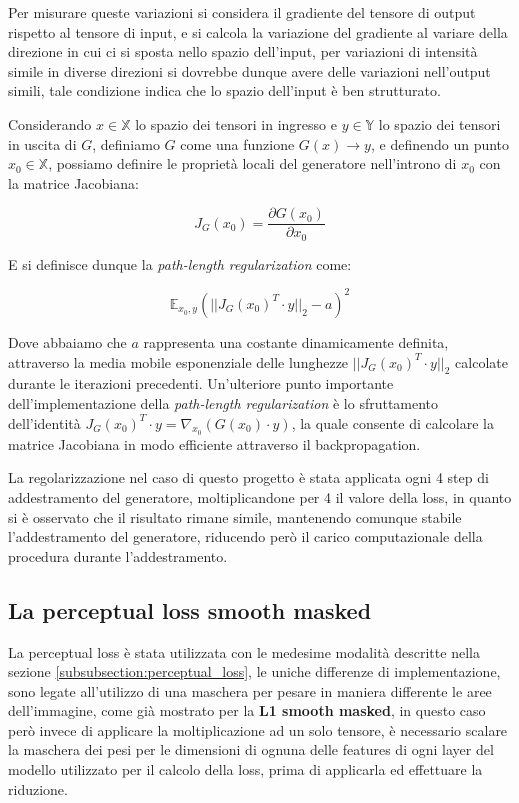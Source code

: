 Per misurare queste variazioni si considera il gradiente del tensore di output rispetto al tensore di input, e si calcola la variazione del gradiente
al variare della direzione in cui ci si sposta nello spazio dell'input, per variazioni di intensità simile in diverse direzioni si dovrebbe dunque avere delle variazioni
nell'output simili, tale condizione indica che lo spazio dell'input è ben strutturato.

Considerando $x \in \mathbb{X}$ lo spazio dei tensori in ingresso e $y \in \mathbb{Y}$ lo spazio dei tensori in uscita di $G$, definiamo $G$ come una funzione
$G(x) \rightarrow y$, e definendo un punto $x_0 \in \mathbb{X}$, possiamo definire le proprietà locali del generatore nell'introno di $x_0$ con la matrice Jacobiana:

\begin{equation}
    J_{G}(x_0) = \frac{\partial G(x_0)}{\partial x_0}
    \label{eq:jacobian_matrix}
\end{equation}

E si definisce dunque la \textit{path-length regularization} come:

\begin{equation}
    \mathbb{E}_{x_0,y}(||J_{G}(x_0)^T \cdot y||_2 - a)^2
    \label{eq:path_length_regularization}
\end{equation}

Dove abbaiamo che $a$ rappresenta una costante dinamicamente definita, attraverso la media mobile esponenziale delle lunghezze 
$||J_{G}(x_0)^T \cdot y||_2$ calcolate durante le iterazioni precedenti.
Un'ulteriore punto importante dell'implementazione della \textit{path-length regularization} è lo sfruttamento dell'identità 
$J_{G}(x_0)^T \cdot y = \nabla_{x_0}(G(x_0) \cdot y)$, la quale consente di calcolare la matrice Jacobiana in modo efficiente attraverso il backpropagation.

La regolarizzazione nel caso di questo progetto è stata applicata ogni 4 step di addestramento del generatore, moltiplicandone per 4 il valore della loss,
in quanto si è osservato che il risultato rimane simile, mantenendo comunque stabile l'addestramento del generatore, riducendo però il carico computazionale
della procedura durante l'addestramento.

\subsection{La perceptual loss smooth masked}
La perceptual loss è stata utilizzata con le medesime modalità descritte nella sezione \ref{subsubsection:perceptual_loss}, le uniche
differenze di implementazione, sono legate all'utilizzo di una maschera per pesare in maniera differente le aree dell'immagine, come già mostrato per
la \textbf{L1 smooth masked}, in questo caso però invece di applicare la moltiplicazione ad un solo tensore, è necessario scalare la maschera dei pesi
per le dimensioni di ognuna delle features di ogni layer del modello utilizzato per il calcolo della loss, prima di applicarla ed effettuare la riduzione.

